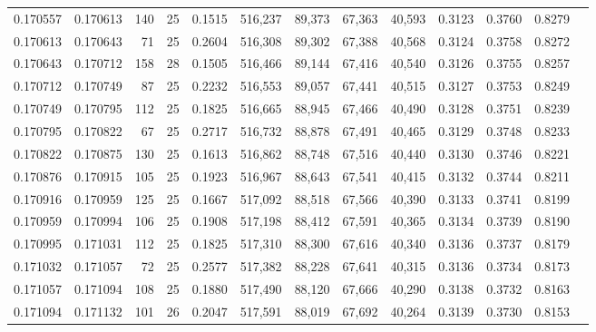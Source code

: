 \begin{tabular}{rrrrrrrrrrrrr}
0.170557 & 0.170613 &   140 &  25 &                                     0.1515 & 516,237 &  89,373 &  67,363 &  40,593 & 0.3123 & 0.3760 & 0.8279 \\
0.170613 & 0.170643 &    71 &  25 &                                     0.2604 & 516,308 &  89,302 &  67,388 &  40,568 & 0.3124 & 0.3758 & 0.8272 \\
0.170643 & 0.170712 &   158 &  28 &                                     0.1505 & 516,466 &  89,144 &  67,416 &  40,540 & 0.3126 & 0.3755 & 0.8257 \\
0.170712 & 0.170749 &    87 &  25 &                                     0.2232 & 516,553 &  89,057 &  67,441 &  40,515 & 0.3127 & 0.3753 & 0.8249 \\
0.170749 & 0.170795 &   112 &  25 &                                     0.1825 & 516,665 &  88,945 &  67,466 &  40,490 & 0.3128 & 0.3751 & 0.8239 \\
0.170795 & 0.170822 &    67 &  25 &                                     0.2717 & 516,732 &  88,878 &  67,491 &  40,465 & 0.3129 & 0.3748 & 0.8233 \\
0.170822 & 0.170875 &   130 &  25 &                                     0.1613 & 516,862 &  88,748 &  67,516 &  40,440 & 0.3130 & 0.3746 & 0.8221 \\
0.170876 & 0.170915 &   105 &  25 &                                     0.1923 & 516,967 &  88,643 &  67,541 &  40,415 & 0.3132 & 0.3744 & 0.8211 \\
0.170916 & 0.170959 &   125 &  25 &                                     0.1667 & 517,092 &  88,518 &  67,566 &  40,390 & 0.3133 & 0.3741 & 0.8199 \\
0.170959 & 0.170994 &   106 &  25 &                                     0.1908 & 517,198 &  88,412 &  67,591 &  40,365 & 0.3134 & 0.3739 & 0.8190 \\
0.170995 & 0.171031 &   112 &  25 &                                     0.1825 & 517,310 &  88,300 &  67,616 &  40,340 & 0.3136 & 0.3737 & 0.8179 \\
0.171032 & 0.171057 &    72 &  25 &                                     0.2577 & 517,382 &  88,228 &  67,641 &  40,315 & 0.3136 & 0.3734 & 0.8173 \\
0.171057 & 0.171094 &   108 &  25 &                                     0.1880 & 517,490 &  88,120 &  67,666 &  40,290 & 0.3138 & 0.3732 & 0.8163 \\
0.171094 & 0.171132 &   101 &  26 &                                     0.2047 & 517,591 &  88,019 &  67,692 &  40,264 & 0.3139 & 0.3730 & 0.8153 \\

\end{tabular}
